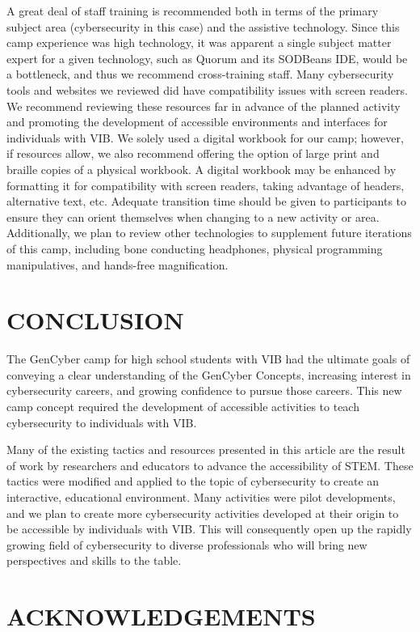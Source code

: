 \documentclass[11.5pt]{sig-alternate} %
\begin{document}
\begin{large}
A great deal of staff training is recommended both in terms of the primary subject area (cybersecurity in this case) and the assistive technology. Since this camp experience was high technology, it was apparent a single subject matter expert for a given technology, such as Quorum and its SODBeans IDE, would be a bottleneck, and thus we recommend cross-training staff. Many cybersecurity tools and websites we reviewed did have compatibility issues with screen readers. We recommend reviewing these resources far in advance of the planned activity and promoting the development of accessible environments and interfaces for individuals with VIB. We solely used a digital workbook for our camp; however, if resources allow, we also recommend offering the option of large print and braille copies of a physical workbook. A digital workbook may be enhanced by formatting it for compatibility with screen readers, taking advantage of headers, alternative text, etc. Adequate transition time should be given to participants to ensure they can orient themselves when changing to a new activity or area. Additionally, we plan to review other technologies to supplement future iterations of this camp, including bone conducting headphones, physical programming manipulatives, and hands-free magnification.

\section*{CONCLUSION}

The GenCyber camp for high school students with VIB had the ultimate goals of conveying a clear understanding of the GenCyber Concepts, increasing interest in cybersecurity careers, and growing confidence to pursue those careers. This new camp concept required the development of accessible activities to teach cybersecurity to individuals with VIB. 

Many of the existing tactics and resources presented in this article are the result of work by researchers and educators to advance the accessibility of STEM. These tactics were modified and applied to the topic of cybersecurity to create an interactive, educational environment. Many activities were pilot developments, and we plan to create more cybersecurity activities developed at their origin to be accessible by individuals with VIB. This will consequently open up the rapidly growing field of cybersecurity to diverse professionals who will bring new perspectives and skills to the table.

\section*{ACKNOWLEDGEMENTS}


\end{large}
\end{document}
